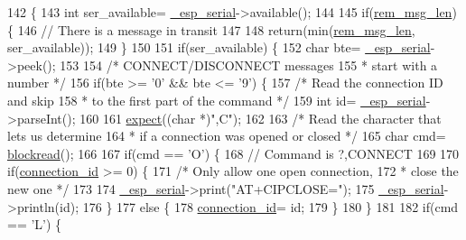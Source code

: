 \begin{DoxyCode}
142 \{
143   \textcolor{keywordtype}{int} ser\_available= \hyperlink{class_esp_server_a552aab874ad99b696f4c997d6f5a4746}{\_esp\_serial}->available();
144 
145   \textcolor{keywordflow}{if}(\hyperlink{class_esp_server_a34a62d83c82a13f441af983f9b212e25}{rem\_msg\_len}) \{
146     \textcolor{comment}{// There is a message in transit}
147 
148     \textcolor{keywordflow}{return}(min(\hyperlink{class_esp_server_a34a62d83c82a13f441af983f9b212e25}{rem\_msg\_len}, ser\_available));
149   \}
150 
151   \textcolor{keywordflow}{if}(ser\_available) \{
152     \textcolor{keywordtype}{char} bte= \hyperlink{class_esp_server_a552aab874ad99b696f4c997d6f5a4746}{\_esp\_serial}->peek();
153 
154     \textcolor{comment}{/* CONNECT/DISCONNECT messages}
155 \textcolor{comment}{     * start with a number */}
156     \textcolor{keywordflow}{if}(bte >= \textcolor{charliteral}{'0'} && bte <= \textcolor{charliteral}{'9'}) \{
157       \textcolor{comment}{/* Read the connection ID and skip}
158 \textcolor{comment}{       * to the first part of the command */}
159       \textcolor{keywordtype}{int} \textcolor{keywordtype}{id}= \hyperlink{class_esp_server_a552aab874ad99b696f4c997d6f5a4746}{\_esp\_serial}->parseInt();
160 
161       \hyperlink{class_esp_server_aff5ea67ab96af075223b2b836036ccf1}{expect}((\textcolor{keywordtype}{char} *)\textcolor{stringliteral}{",C"});
162 
163       \textcolor{comment}{/* Read the character that lets us determine}
164 \textcolor{comment}{       * if a connection was opened or closed */}
165       \textcolor{keywordtype}{char} cmd= \hyperlink{class_esp_server_ac2b4ae3c7ebcd751c4c8020412fa3270}{blockread}();
166 
167       \textcolor{keywordflow}{if}(cmd == \textcolor{charliteral}{'O'}) \{
168         \textcolor{comment}{// Command is ?,CONNECT}
169 
170         \textcolor{keywordflow}{if}(\hyperlink{class_esp_server_a821bd4e05f0b260cc584a2d23bda0fff}{connection\_id} >= 0) \{
171           \textcolor{comment}{/* Only allow one open connection,}
172 \textcolor{comment}{           * close the new one */}
173 
174           \hyperlink{class_esp_server_a552aab874ad99b696f4c997d6f5a4746}{\_esp\_serial}->print(\textcolor{stringliteral}{"AT+CIPCLOSE="});
175           \hyperlink{class_esp_server_a552aab874ad99b696f4c997d6f5a4746}{\_esp\_serial}->println(\textcolor{keywordtype}{id});
176         \}
177         \textcolor{keywordflow}{else} \{
178           \hyperlink{class_esp_server_a821bd4e05f0b260cc584a2d23bda0fff}{connection\_id}= id;
179         \}
180       \}
181 
182       \textcolor{keywordflow}{if}(cmd == \textcolor{charliteral}{'L'}) \{

\end{DoxyCode}
